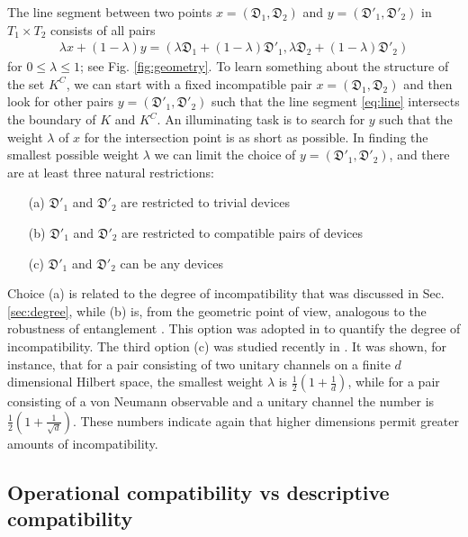 \documentclass[12pt]{article}
\theoremstyle{definition}
\newcommand{\half}{\tfrac{1}{2}} %
\newcommand{\Dev}{\mathfrak{D}} %
\begin{document}
The line segment between two points $x=(\Dev_1,\Dev_2)$ and $y=(\Dev'_1,\Dev'_2)$ in $T_1\times T_2$ consists of all pairs 
\begin{align}\label{eq:line}
\lambda x + (1-\lambda) y = (\lambda \Dev_1 + (1-\lambda) \Dev'_1,\lambda \Dev_2 + (1-\lambda) \Dev'_2) 
\end{align}
for $0\leq\lambda\leq 1$; see Fig. \ref{fig:geometry}.
To learn something about the structure of the set $K^C$, we can start with a fixed incompatible pair $x=(\Dev_1,\Dev_2)$ and then look for other pairs $y=(\Dev'_1,\Dev'_2)$ such that the line segment \eqref{eq:line} intersects the boundary of $K$ and $K^C$.
An illuminating task is to search for $y$ such that the weight $\lambda$ of $x$ for the intersection point is as short as possible. 
In finding the smallest possible weight $\lambda$ we can limit the choice of $y=(\Dev'_1,\Dev'_2)$, and there are at least three natural restrictions:
\begin{itemize}
\item[(a)] $\Dev'_1$ and $\Dev'_2$ are restricted to trivial devices
\item[(b)] $\Dev'_1$ and $\Dev'_2$ are restricted to compatible pairs of devices
\item[(c)] $\Dev'_1$ and $\Dev'_2$ can be any devices
\end{itemize}
Choice (a) is related to the degree of incompatibility that was discussed in Sec. \ref{sec:degree}, while (b) is, from the geometric point of view, analogous to the robustness of entanglement \cite{ViTa99}. 
This option was adopted in \cite{MaAcGi06} to quantify the degree of incompatibility.  
The third option (c) was studied recently in \cite{Haapasalo15}.
It was shown, for instance, that for a pair consisting of two unitary channels on a finite $d$ dimensional Hilbert space, the smallest weight $\lambda$ is
$\half \left( 1 + \frac{1}{d} \right)$,
while for a pair consisting of a von Neumann observable and a unitary channel the number is $\half \left( 1 + \frac{1}{\sqrt{d}} \right)$.
These numbers indicate again that higher dimensions permit greater amounts of incompatibility.  

\subsection{Operational compatibility vs descriptive compatibility}
\end{document}
